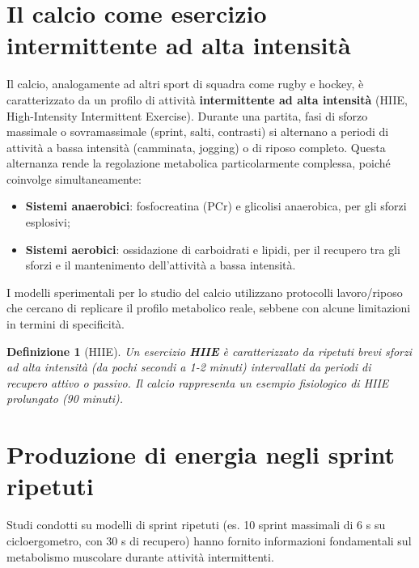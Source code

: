 \documentclass[12pt,a4paper]{report}
\newtheorem{definizione}{Definizione}[section]
\begin{document}
\section{Il calcio come esercizio intermittente ad alta intensità}
Il calcio, analogamente ad altri sport di squadra come rugby e hockey, è caratterizzato da un profilo di attività \textbf{intermittente ad alta intensità} (HIIE, High-Intensity Intermittent Exercise). Durante una partita, fasi di sforzo massimale o sovramassimale (sprint, salti, contrasti) si alternano a periodi di attività a bassa intensità (camminata, jogging) o di riposo completo.
Questa alternanza rende la regolazione metabolica particolarmente complessa, poiché coinvolge simultaneamente:
\begin{itemize}
\item \textbf{Sistemi anaerobici}: fosfocreatina (PCr) e glicolisi anaerobica, per gli sforzi esplosivi;
\item \textbf{Sistemi aerobici}: ossidazione di carboidrati e lipidi, per il recupero tra gli sforzi e il mantenimento dell'attività a bassa intensità.
\end{itemize}
I modelli sperimentali per lo studio del calcio utilizzano protocolli lavoro/riposo che cercano di replicare il profilo metabolico reale, sebbene con alcune limitazioni in termini di specificità.
\begin{definizione}[HIIE]
Un esercizio \textbf{HIIE} è caratterizzato da ripetuti brevi sforzi ad alta intensità (da pochi secondi a 1-2 minuti) intervallati da periodi di recupero attivo o passivo. Il calcio rappresenta un esempio fisiologico di HIIE prolungato (90 minuti).
\end{definizione}

\section{Produzione di energia negli sprint ripetuti}
Studi condotti su modelli di sprint ripetuti (es. 10 sprint massimali di 6 s su cicloergometro, con 30 s di recupero) hanno fornito informazioni fondamentali sul metabolismo muscolare durante attività intermittenti.
\end{document}
